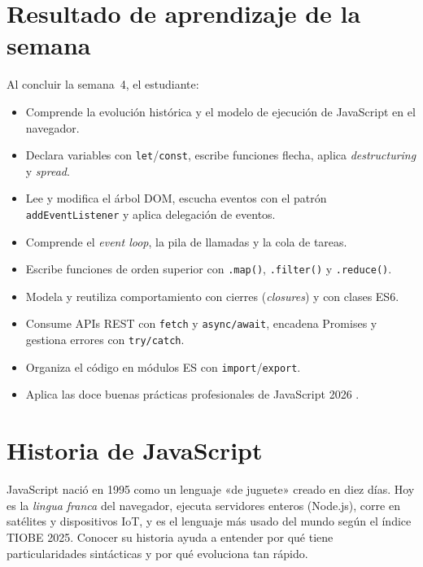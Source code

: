 \documentclass[11pt,a4paper,openany]{book}
\begin{document}
	\section*{Resultado de aprendizaje de la semana}
	
	Al concluir la semana~4, el estudiante:
	\begin{itemize}
		\item Comprende la evolución histórica y el modelo de ejecución de
		JavaScript en el navegador.
		\item Declara variables con \texttt{let}/\texttt{const}, escribe
		funciones flecha, aplica \emph{destructuring} y \emph{spread}.
		\item Lee y modifica el árbol DOM, escucha eventos con el patrón
		\texttt{addEventListener} y aplica delegación de eventos.
		\item Comprende el \emph{event loop}, la pila de llamadas y la cola
		de tareas.
		\item Escribe funciones de orden superior con \texttt{.map()},
		\texttt{.filter()} y \texttt{.reduce()}.
		\item Modela y reutiliza comportamiento con cierres (\emph{closures})
		y con clases ES6.
		\item Consume APIs REST con \texttt{fetch} y \texttt{async/await},
		encadena Promises y gestiona errores con \texttt{try/catch}.
		\item Organiza el código en módulos ES con \texttt{import}/\texttt{export}.
		\item Aplica las doce buenas prácticas profesionales de JavaScript
		2026 \cite{flanagan2020javascript,crockford2008javascript}.
	\end{itemize}
	
	\section{Historia de JavaScript}
	\label{sec:4.historia}
	
	JavaScript nació en 1995 como un lenguaje «de juguete» creado en
	diez días. Hoy es la \emph{lingua franca} del navegador, ejecuta
	servidores enteros (Node.js), corre en satélites y dispositivos IoT,
	y es el lenguaje más usado del mundo según el índice TIOBE 2025.
	Conocer su historia ayuda a entender por qué tiene particularidades
	sintácticas y por qué evoluciona tan rápido.
	
\end{document}
